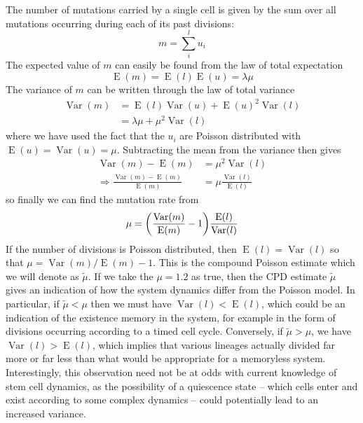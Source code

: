 \documentclass[pdftex,12pt,a4paper]{scrartcl}
\newcommand{\E}{\operatorname{E}}
\newcommand{\Var}{\operatorname{Var}}
\begin{document}
The number of mutations carried by a single cell is given by the sum over all mutations occurring during each of its past divisions:
\begin{equation}
    m = \sum_i^l u_i
\end{equation}
The expected value of $m$ can easily be found from the law of total expectation
\begin{equation}
    \E (m) = \E(l) \E(u) = \lambda \mu
\end{equation}
The variance of $m$ can be written through the law of total variance
\begin{align}
    \Var(m) &= \E(l) \Var(u) + \E(u)^2 \Var(l) \\
    &= \lambda \mu + \mu^2 \Var(l)
\end{align}
where we have used the fact that the $u_i$ are Poisson distributed with $\E(u) = \Var(u) = \mu$. Subtracting the mean from the variance then gives
\begin{align*}
    \Var(m) - \E(m) &= \mu^2 \Var(l) \\
    \Rightarrow \frac{\Var(m) - \E(m)}{\E(m)} &= \mu \frac{\Var(l)}{\E(l)}
\end{align*}
so finally we can find the mutation rate from
\begin{equation}
    \mu = \qty( \frac{\Var(m)}{\E(m)} - 1 ) \frac{\E(l)}{\Var(l)}
\end{equation}
If the number of divisions is Poisson distributed, then $\E(l) = \Var(l)$ so that $\mu = \Var(m)/\E(m) -1$. This is the compound Poisson estimate which we will denote as $\tilde{\mu}$. If we take the $\mu=1.2$ as true, then the CPD estimate $\tilde{\mu}$ gives an indication of how the system dynamics differ from the Poisson model. In particular, if $\tilde{\mu} < \mu$ then we must have $\Var(l) < \E(l)$, which could be an indication of the existence memory in the system, for example in the form of divisions occurring according to a timed cell cycle. Conversely, if $\tilde{\mu} > \mu$, we have $\Var(l) > \E(l)$, which implies that various lineages actually divided far more or far less than what would be appropriate for a memoryless system. Interestingly, this observation need not be at odds with current knowledge of stem cell dynamics, as the possibility of a quiescence state -- which cells enter and exist according to some complex dynamics -- could potentially lead to an increased variance.
\end{document}
